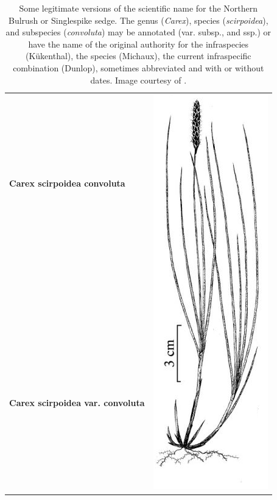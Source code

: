\documentclass{bmcart}
\begin{document}
\begin{table}[!htb]
  \begin{center}

  \caption{Some legitimate versions of the scientific name for the Northern
    Bulrush or Singlespike sedge.  The genus (\textit{Carex}), species
    (\textit{scirpoidea}), and subspecies (\textit{convoluta}) may be annotated
    (var. subsp., and ssp.) or have the name of the original authority for the
    infraspecies (Kükenthal), the species (Michaux), the current infraspecific
    combination (Dunlop), sometimes abbreviated and with or without dates.
    Image courtesy of \cite{FNA2002}.}\label{table:carex}

    \begin{tabular}{| l | c |}
    \hline
    \textbf{Carex scirpoidea convoluta} &
    \multirow{26}{*}{\includegraphics[scale=0.3]{images/carex.png}} \\
    & \\
    \textbf{Carex scirpoidea var. convoluta} & \\

\end{tabular}
\end{center}
\end{table}
\end{document}

